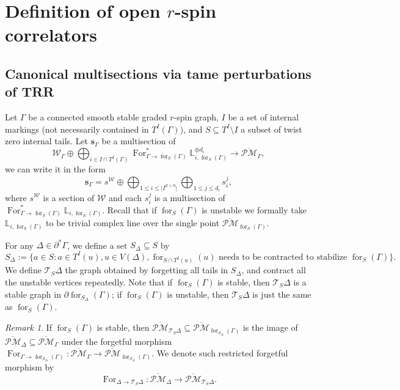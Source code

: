 \documentclass[11pt]{amsart}
\theoremstyle{definition}
\theoremstyle{remark}
\newtheorem{rmk}[dummy]{Remark}
\newcommand{\oPMb}{{\overline{\mathcal{PM}}}}
\newcommand{\<}{\left<}
\renewcommand{\>}{\right>}
\numberwithin{equation}{section}
\begin{document}
\section{Definition of open $r$-spin correlators}\label{sec sections def etc}


    \subsection{Canonical multisections via tame perturbations of TRR}\label{sec def of tame and canonical}
    Let $\Gamma$ be a connected smooth stable graded $r$-spin graph, $I$ be a set of internal markings (not necessarily contained in $T^I(\Gamma)$), and $S\subseteq T^I\setminus I$ a subset of twist zero internal tails.
    Let $\bm{s}_\Gamma$ be a multisection of 
    $$\mathcal W_{\Gamma}\oplus \bigoplus_{i\in I\cap T^I(\Gamma)} \operatorname{For}^*_{\Gamma \to \operatorname{for}_{S}(\Gamma)}{{\mathbb L}}_{i,\operatorname{for}_{S}(\Gamma)}^{\oplus d_i}\to \oPMb_\Gamma,$$ 
    we can write it in the form 
    $$\bm{s}_{\Gamma}=s^{\mathcal W}\oplus\bigoplus_{1\le i \le \lvert I^{d>0}\rvert}\bigoplus_{1\le j \le d_{i}} s^{j}_{i},$$
    where  $s^{\mathcal W}$ is a section of $\mathcal W$ and each $s^{j}_{i}$ is a multisection of $\operatorname{For}^*_{\Gamma \to \operatorname{for}_{S}(\Gamma)}{{\mathbb L}}_{i,\operatorname{for}_{S}(\Gamma)}$. Recall that if $\operatorname{for}_{S}(\Gamma)$ is unstable we formally take ${\mathbb L}_{i,\operatorname{for}_{S}(\Gamma)}$ to be trivial complex line over the single point $\oPMb_{\operatorname{for}_{S}(\Gamma)}$.

    For any $\Delta \in \partial^* \Gamma$, we define a set $S_\Delta \subseteq S$ by 
    $$
    S_{\Delta}:=\{a\in S\colon a\in T^I(u), u\in V(\Delta), \operatorname{for}_{S\cap T^I(u)}(u)\text{ needs to be contracted to stabilize }\operatorname{for}_{S}(\Gamma)\}.
    $$
    We define $\mathcal T_S \Delta$ the graph obtained by forgetting all tails in $S_{\Delta}$, and contract all the unstable vertices repeatedly. Note that if $\operatorname{for}_{S}(\Gamma)$ is stable, then $\mathcal T_S \Delta$ is a stable graph in $\partial \operatorname{for}_{S_\Delta}(\Gamma)$; if $\operatorname{for}_{S}(\Gamma)$ is unstable, then $\mathcal T_S \Delta$ is just the same as $\operatorname{for}_{S}(\Gamma)$. 
    
    \begin{rmk}\label{rmk on forget morphism on strata}
   If $\operatorname{for}_{S}(\Gamma)$ is stable, then $\oPMb_{\mathcal T_S \Delta}\subseteq \oPMb_{\operatorname{for}_{S_\Delta}(\Gamma)}$ is the image of $\oPMb_{\Delta}\subseteq \oPMb_{\Gamma}$ under the forgetful morphism
    $\operatorname{For}_{\Gamma \to \operatorname{for}_{S_\Delta}(\Gamma)}\colon \oPMb_{\Gamma}\to \oPMb_{\operatorname{for}_{S_\Delta}(\Gamma)}$. We denote such restricted forgetful morphism by
    $$
    \operatorname{For}_{\Delta \to {\mathcal T_S \Delta}}\colon \oPMb_{\Delta}\to \oPMb_{\mathcal T_S \Delta}.
    $$
        
    \end{rmk}
\end{document}
